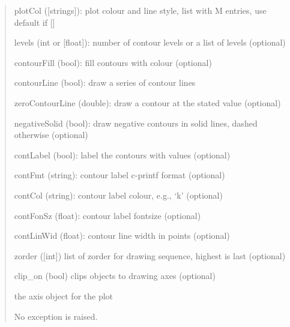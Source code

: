\documentclass[a4paper,10pt,english]{sphinxmanual}
\begin{document}
\begin{fulllineitems}
\begin{fulllineitems}
\begin{quote}
\begin{description}
\begin{DUlineblock}{0em}
\item[] plotCol ({[}strings{]}): plot colour and line style, list with M entries, use default if {[}{]}
\item[] levels (int or {[}float{]}): number of contour levels or a list of levels (optional)
\item[] contourFill (bool): fill contours with colour (optional)
\item[] contourLine (bool): draw a series of contour lines
\item[] zeroContourLine (double): draw a contour at the stated value (optional)
\item[] negativeSolid (bool): draw negative contours in solid lines, dashed otherwise (optional)
\item[] contLabel (bool): label the contours with values (optional)
\item[] contFmt (string): contour label c-printf format (optional)
\item[] contCol (string): contour label colour, e.g., `k' (optional)
\item[] contFonSz (float): contour label fontsize (optional)
\item[] contLinWid (float): contour line width in points (optional)
\item[] zorder ({[}int{]}) list of zorder for drawing sequence, highest is last (optional)
\item[] clip\_on (bool) clips objects to drawing axes (optional)
\end{DUlineblock}

\item[{Returns:}] \leavevmode
\begin{DUlineblock}{0em}
\item[] the axis object for the plot
\end{DUlineblock}

\item[{Raises:}] \leavevmode
\begin{DUlineblock}{0em}
\item[] No exception is raised.
\end{DUlineblock}

\end{description}
\end{quote}

\end{fulllineitems}



\end{fulllineitems}
\end{document}
